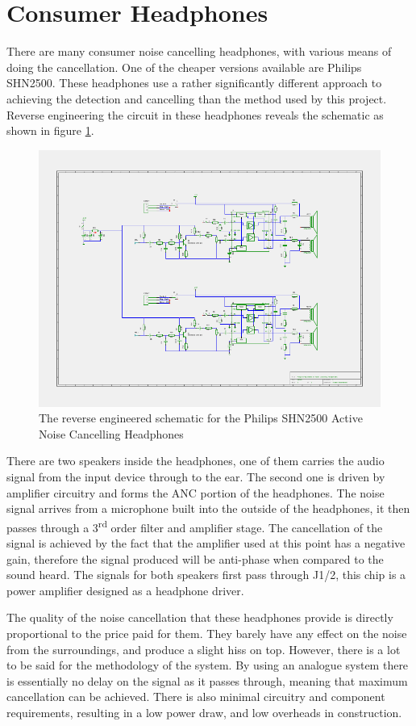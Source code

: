 \section{Consumer Headphones}
There are many consumer noise cancelling headphones, with various means of doing the cancellation.
One of the cheaper versions available are Philips SHN2500.
These headphones use a rather significantly different approach to achieving the detection and cancelling than the method used by this project.
Reverse engineering the circuit in these headphones reveals the schematic as shown in figure \ref{fig:philipsphonessche}.

\begin{figure}[h]
	\centering
	\includegraphics[width=\textwidth]{./img/hp.png}
	\caption{The reverse engineered schematic for the Philips SHN2500 Active Noise Cancelling Headphones}
	\label{fig:philipsphonessche}
\end{figure}

There are two speakers inside the headphones, one of them carries the audio signal from the input device through to the ear.
The second one is driven by amplifier circuitry and forms the ANC portion of the headphones.
The noise signal arrives from a microphone built into the outside of the headphones, it then passes through a 3\textsuperscript{rd} order filter and amplifier stage.
The cancellation of the signal is achieved by the fact that the amplifier used at this point has a negative gain, therefore the signal produced will be anti-phase when compared to the sound heard.
The signals for both speakers first pass through J1/2, this chip is a power amplifier designed as a headphone driver.

The quality of the noise cancellation that these headphones provide is directly proportional to the price paid for them. They barely have any effect on the noise from the surroundings, and produce a slight hiss on top.
However, there is a lot to be said for the methodology of the system. By using an analogue system there is essentially no delay on the signal as it passes through, meaning that maximum cancellation can be achieved.
There is also minimal circuitry and component requirements, resulting in a low power draw, and low overheads in construction.
